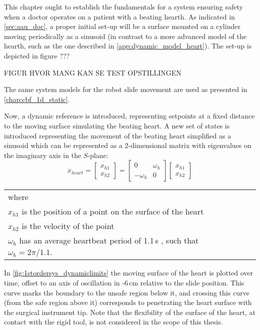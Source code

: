 This chapter ought to establish the fundamentals for a system ensuring safety when a doctor operates on a patient with a beating hearth. As indicated in \autoref{sec:aau_doc}, a proper initial set-up will be a surface mounted on a cylinder moving periodically as a sinusoid (in contrast to a more advanced model of the hearth, such as the one described in \autoref{app:dynamic_model_heart}). The set-up is depicted in figure ???

FIGUR HVOR MANG KAN SE TEST OPSTILLINGEN 

The same system models for the robot slide movement are used as presented in \autoref{chap:cbf_1d_static}.


Now, a dynamic reference is introduced, representing setpoints at a fixed distance to the moving surface simulating the beating heart. A new set of states is introduced representing the movement of the beating heart simplified as a sinusoid which can be represented as a 2-dimensional matrix with eigenvalues on the imaginary axis in the $S$-plane:
\begin{equation}
\dot{x}_{heart} =
\dot{\begin{bmatrix}
x_{h1}\\x_{h2}
\end{bmatrix}} =
\begin{bmatrix}
0 & \omega_h \\ -\omega_h & 0
\end{bmatrix}
\begin{bmatrix}
x_{h1}\\x_{h2}
\end{bmatrix}
\label{eq:beating_heart_sine}
\end{equation}
\vspace{-0.8cm}
\begin{longtable}{p{} p{} p{}} 
where  & & \\
$x_{h1}$ is the position of a point on the surface of the heart \\
$x_{h2}$ is the velocity of the point \\
$\omega_h$ has an average heartbeat period of 1.1\,s \citep{bib:heart_berkeley}, such that $\omega_h = 2\pi/1.1$.
\end{longtable}
\vspace*{-0.2cm}
%
In \autoref{fig:1stordersys_dynamiclimits} the moving surface of the heart is plotted over time, offset to an axis of oscillation in -6\,cm relative to the slide position. This curve marks the boundary to the unsafe region below it, and crossing this curve (from the safe region above it) corresponds to penetrating the heart surface with the surgical instrument tip. Note that the flexibility of the surface of the heart, at contact with the rigid tool, is not considered in the scope of this thesis. 

